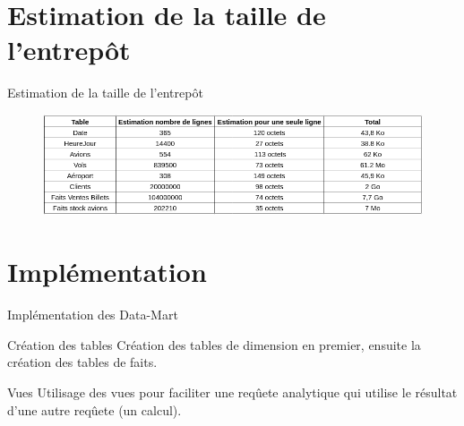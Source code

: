 \documentclass[10pt,handout]{beamer}
\begin{document}
\section{Estimation de la taille de l'entrepôt}
\begin{frame}{Estimation de la taille de l'entrepôt}
  \begin{figure}
    \includegraphics[width=12cm]{img/estimation_taille.png}
  \end{figure}
\end{frame}

\section{Implémentation}

\begin{frame}{Implémentation des Data-Mart}
  \begin{block}{Création des tables}
    Création des tables de dimension en premier, ensuite la création des tables de faits.
  \end{block}
  \begin{block}{Vues}
    Utilisage des vues pour faciliter une reqûete analytique qui utilise le résultat d'une autre reqûete (un calcul).
  \end{block}
\end{frame}
\end{document}
